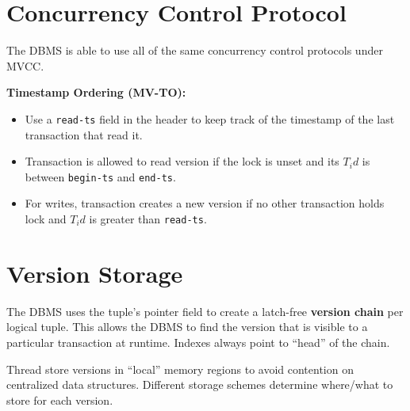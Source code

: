 \documentclass[11pt]{article}
\begin{document}
\section{Concurrency Control Protocol}
The DBMS is able to use all of the same concurrency control protocols under MVCC.

\textbf{Timestamp Ordering (MV-TO):}
\begin{itemize}
    \item
    Use a \texttt{read-ts} field in the header to keep track of the timestamp of the last 
    transaction that read it.
    
    \item
    Transaction is allowed to read version if the lock is unset and its $T_id$ is between 
    \texttt{begin-ts} and \texttt{end-ts}.
    
    \item
    For writes, transaction creates a new version if no other transaction holds lock and 
    $T_id$ is greater than \texttt{read-ts}.
\end{itemize}

\section{Version Storage}
The DBMS uses the tuple's pointer field to create a latch-free \textbf{version chain} per logical 
tuple. This allows the DBMS to find the version that is visible to a particular transaction at 
runtime. Indexes always point to ``head'' of the chain.

Thread store versions in ``local'' memory regions to avoid contention on centralized data 
structures. Different storage schemes determine where/what to store for each version.
\end{document}
